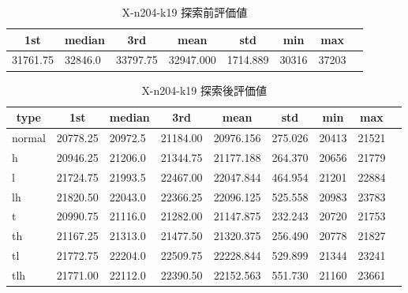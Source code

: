 \begin{table}[htbp]
    \caption{X-n204-k19 探索前評価値}
    \begin{tabular}{|l|l|l|l|l|l|l|l|}\hline
    \multicolumn{1}{|c|}{\textbf{1st}}
    &\multicolumn{1}{c|}{\textbf{median}}
    &\multicolumn{1}{c|}{\textbf{3rd}}
    &\multicolumn{1}{c|}{\textbf{mean}}
    &\multicolumn{1}{c|}{\textbf{std}}
    &\multicolumn{1}{c|}{\textbf{min}}
    &\multicolumn{1}{c|}{\textbf{max}}\\\hline
	31761.75 & 32846.0 & 33797.75 & 32947.000 & 1714.889 & 30316 & 37203\\\hline
	\end{tabular}
\end{table}
\begin{table}[htbp]
    \caption{X-n204-k19 探索後評価値}
    \begin{tabular}{|l|l|l|l|l|l|l|l|l|}\hline
    \multicolumn{1}{|c|}{\textbf{type}}
    &\multicolumn{1}{|c|}{\textbf{1st}}
    &\multicolumn{1}{c|}{\textbf{median}}
    &\multicolumn{1}{c|}{\textbf{3rd}}
    &\multicolumn{1}{c|}{\textbf{mean}}
    &\multicolumn{1}{c|}{\textbf{std}}
    &\multicolumn{1}{c|}{\textbf{min}}
    &\multicolumn{1}{c|}{\textbf{max}}\\\hline
	normal & 20778.25 & 20972.5 & 21184.00 & 20976.156 & 275.026 & 20413 & 21521\\\hline
	h & 20946.25 & 21206.0 & 21344.75 & 21177.188 & 264.370 & 20656 & 21779\\\hline
	l & 21724.75 & 21993.5 & 22467.00 & 22047.844 & 464.954 & 21201 & 22884\\\hline
	lh & 21820.50 & 22043.0 & 22366.25 & 22096.125 & 525.558 & 20983 & 23783\\\hline
	t & 20990.75 & 21116.0 & 21282.00 & 21147.875 & 232.243 & 20720 & 21753\\\hline
	th & 21167.25 & 21313.0 & 21477.50 & 21320.375 & 256.490 & 20778 & 21827\\\hline
	tl & 21772.75 & 22204.0 & 22509.75 & 22228.844 & 529.899 & 21344 & 23241\\\hline
	tlh & 21771.00 & 22112.0 & 22390.50 & 22152.563 & 551.730 & 21160 & 23661\\\hline
	\end{tabular}
\end{table}
